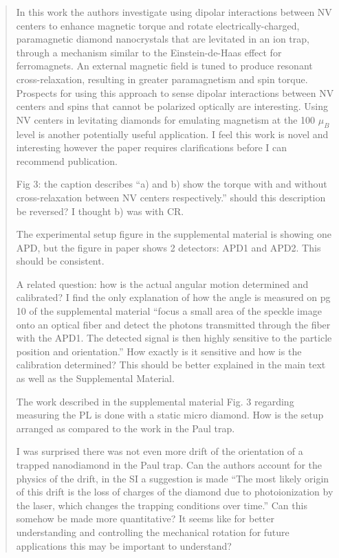 \documentclass{article}
\begin{document}
\begin{quote}
In this work the authors investigate using dipolar interactions
between NV centers to enhance magnetic torque and rotate
electrically-charged, paramagnetic diamond nanocrystals that are
levitated in an ion trap, through a mechanism similar to the
Einstein-de-Haas effect for ferromagnets. An external magnetic field
is tuned to produce resonant cross-relaxation, resulting in greater
paramagnetism and spin torque. Prospects for using this approach to
sense dipolar interactions between NV centers and spins that cannot be
polarized optically are interesting. Using NV centers in levitating
diamonds for emulating magnetism at the 100 $\mu_B$ level is another
potentially useful application. I feel this work is novel and
interesting however the paper requires clarifications before I can
recommend publication.

Fig 3: the caption describes “a) and b) show the torque with and
without cross-relaxation between NV centers respectively.” should this
description be reversed? I thought b) was with CR.

The experimental setup figure in the supplemental material is showing
one APD, but the figure in paper shows 2 detectors: APD1 and APD2.
This should be consistent.

A related question: how is the actual angular motion determined and
calibrated? I find the only explanation of how the angle is measured
on pg 10 of the supplemental material “focus a small area of the
speckle image onto an optical fiber and detect the photons transmitted
through the fiber with the APD1. The detected signal is then highly
sensitive to the particle position and orientation.” How exactly is it
sensitive and how is the calibration determined? This should be better
explained in the main text as well as the Supplemental Material.

The work described in the supplemental material Fig. 3 regarding
measuring the PL is done with a static micro diamond. How is the setup
arranged as compared to the work in the Paul trap.

I was surprised there was not even more drift of the orientation of a
trapped nanodiamond in the Paul trap. Can the authors account for the
physics of the drift, in the SI a suggestion is made “The most likely
origin of this drift is the loss of charges of the diamond due to
photoionization by the laser, which changes the trapping conditions
over time.” Can this somehow be made more quantitative? It seems like
for better understanding and controlling the mechanical rotation for
future applications this may be important to understand?
\end{quote}
\end{document}
